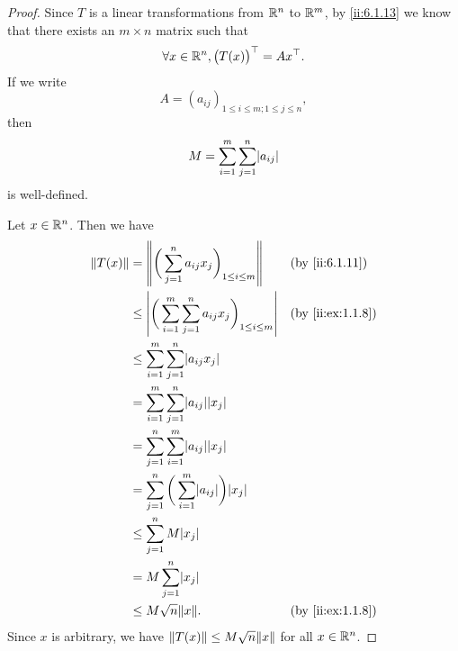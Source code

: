 \begin{proof}
  Since \(T\) is a linear transformations from \(\mathbb{R}^n\) to \(\mathbb{R}^m\), by \cref{ii:6.1.13} we know that there exists an \(m \times n\) matrix such that
  \[
    \forall x \in \mathbb{R}^n, \big(T(x)\big)^\top = Ax^\top.
  \]
  If we write
  \[
    A = (a_{ij})_{1 \leq i \leq m ; 1 \leq j \leq n},
  \]
  then
  \[
    M = \sum_{i = 1}^m \sum_{j = 1}^n \abs{a_{ij}}
  \]
  is well-defined.

  Let \(x \in \mathbb{R}^n\).
  Then we have
  \begin{align*}
    \norm*{T(x)} & = \norm*{\bigg(\sum_{j = 1}^n a_{ij} x_j\bigg)_{1 \leq i \leq m}}                 &  & \by{ii:6.1.11}   \\
                 & \leq \abs{\bigg(\sum_{i = 1}^m \sum_{j = 1}^n a_{ij} x_j\bigg)_{1 \leq i \leq m}} &  & \by{ii:ex:1.1.8} \\
                 & \leq \sum_{i = 1}^m \sum_{j = 1}^n \abs{a_{ij} x_j}                                                     \\
                 & = \sum_{i = 1}^m \sum_{j = 1}^n \abs{a_{ij}} \abs{x_j}                                                  \\
                 & = \sum_{j = 1}^n \sum_{i = 1}^m \abs{a_{ij}} \abs{x_j}                                                  \\
                 & = \sum_{j = 1}^n \bigg(\sum_{i = 1}^m \abs{a_{ij}}\bigg) \abs{x_j}                                      \\
                 & \leq \sum_{j = 1}^n M \abs{x_j}                                                                         \\
                 & = M \sum_{j = 1}^n \abs{x_j}                                                                            \\
                 & \leq M \sqrt{n} \norm*{x}.                                                        &  & \by{ii:ex:1.1.8}
  \end{align*}
  Since \(x\) is arbitrary, we have \(\norm*{T(x)} \leq M \sqrt{n} \norm*{x}\) for all \(x \in \mathbb{R}^n\).


\end{proof}
